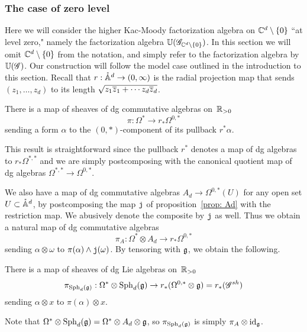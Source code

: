 \subsubsection{The case of zero level}

Here we will consider the higher Kac-Moody factorization algebra on $\mathbb C^d \setminus \{0\}$ ``at level zero," namely the factorization algebra $\mathbb U(\mathscr G_{\mathbb C^d \setminus\{0\}})$.
In this section we will omit $\mathbb C^d \setminus \{0\}$ from the notation, and simply refer to the factorization algebra by $\mathbb U(\mathscr G)$. 
Our construction will follow the model case outlined in the introduction to this section.
Recall that $r: \mathring{\mathbb A}^d \to (0,\infty)$ is the radial projection map that sends $(z_1,\ldots,z_d)$ to its length $\sqrt{z_1\overline{z}_1 + \cdots z_d \overline{z}_d}$.

\begin{lem}
There is a map of sheaves of dg commutative algebras on~$\mathbb R_{>0}$
\[
\pi: \Omega^* \to r_* \Omega^{0,*}
\]
sending a form $\alpha$ to the $(0,*)$-component of its pullback $r^*\alpha$.
\end{lem}

This result is straightforward since the pullback $r^*$ denotes a map of dg algebras to $r_* \Omega^{*,*}$ and we are simply postcomposing with the canonical quotient map of dg algebras $\Omega^{*,*} \to \Omega^{0,*}$. 

We also have a map of dg commutative algebras $A_d \to \Omega^{0,*}(U)$ for any open set $U \subset \mathring{\mathbb A}^d$,
by postcomposing the map ${\mathtt{j}}$ of proposition~\ref{prop: Ad} with the restriction map.
We abusively denote the composite by ${\mathtt{j}}$ as well.
Thus we obtain a natural map of dg commutative algebras
\[
\pi_A: \Omega^* \otimes A_d \to r_* \Omega^{0,*}
\]
sending $\alpha \otimes \omega$ to $\pi(\alpha) \wedge {\mathtt{j}}(\omega)$.
By tensoring with $\mathfrak g$, we obtain the following.

\begin{cor}
There is a map of sheaves of dg Lie algebras on~$\mathbb R_{>0}$
\[
\pi_{{\rm Sph}_d(\mathfrak g)}: \Omega^* \otimes {\rm Sph}_d(\mathfrak g) \to r_* (\Omega^{0,*}\otimes \mathfrak g) = r_*(\mathscr G^{sh})
\]
sending $\alpha \otimes x$ to $\pi(\alpha) \otimes x$.
\end{cor}

Note that $\Omega^* \otimes {\rm Sph}_d(\mathfrak g) = \Omega^* \otimes A_d \otimes \mathfrak g$, so $\pi_{{\rm Sph}_d(\mathfrak g)}$ is simply $\pi_A \otimes {\rm id}_\mathfrak g$.

